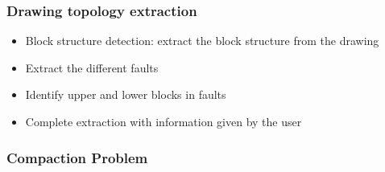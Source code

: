 \documentclass{beamer}
\begin{document}
	\begin{frame}
	\frametitle{Drawing topology extraction}
	\begin{itemize}
    \item Block structure detection: extract the block structure from the drawing
    \item Extract the different faults
    \item Identify upper and lower blocks in faults
    \item Complete extraction with information given by the user
    \end{itemize}
	\end{frame}	
	
	\begin{frame}
	\frametitle{Compaction Problem}
	\end{frame}
\end{document}
